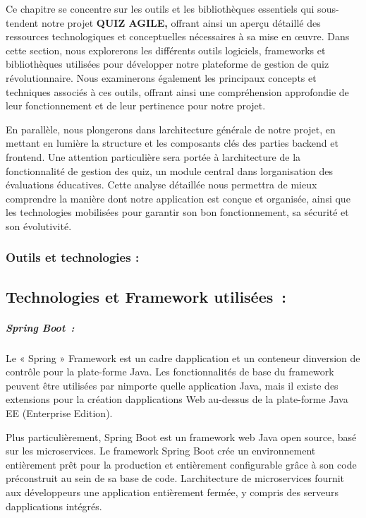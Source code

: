 \documentclass[12pt,a4paper,twoside]{report}
\begin{document}
Ce chapitre se concentre sur les outils et les bibliothèques essentiels
qui sous-tendent notre projet \textbf{QUIZ AGILE,} offrant ainsi un
aperçu détaillé des ressources technologiques et conceptuelles
nécessaires à sa mise en œuvre. Dans cette section, nous explorerons les
différents outils logiciels, frameworks et bibliothèques utilisées pour
développer notre plateforme de gestion de quiz révolutionnaire. Nous
examinerons également les principaux concepts et techniques associés à
ces outils, offrant ainsi une compréhension approfondie de leur
fonctionnement et de leur pertinence pour notre projet.

En parallèle, nous plongerons dans l\textquotesingle architecture
générale de notre projet, en mettant en lumière la structure et les
composants clés des parties backend et frontend. Une attention
particulière sera portée à l\textquotesingle architecture de la
fonctionnalité de gestion des quiz, un module central dans
l\textquotesingle organisation des évaluations éducatives. Cette analyse
détaillée nous permettra de mieux comprendre la manière dont notre
application est conçue et organisée, ainsi que les technologies
mobilisées pour garantir son bon fonctionnement, sa sécurité et son
évolutivité.

\hypertarget{outils-et-technologies}{%
\subsubsection{Outils et technologies :}\label{outils-et-technologies}}

\hypertarget{technologies-et-framework-utilisuxe9es}{%
\subsection{Technologies et Framework
utilisées~:}\label{technologies-et-framework-utilisuxe9es}}

\hypertarget{spring-boot}{%
\subparagraph{Spring Boot~:}\label{spring-boot}}

Le « Spring » Framework est un cadre d\textquotesingle application et un
conteneur d\textquotesingle inversion de contrôle pour la plate-forme
Java. Les fonctionnalités de base du framework peuvent être utilisées
par n\textquotesingle importe quelle application Java, mais il existe
des extensions pour la création d\textquotesingle applications Web
au-dessus de la plate-forme Java EE (Enterprise Edition).

Plus particulièrement, Spring Boot est un framework web Java open
source, basé sur les microservices. Le framework Spring Boot crée un
environnement entièrement prêt pour la production et entièrement
configurable grâce à son code préconstruit au sein de sa base de code.
L\textquotesingle architecture de microservices fournit aux développeurs
une application entièrement fermée, y compris des serveurs
d\textquotesingle applications intégrés.
\end{document}
